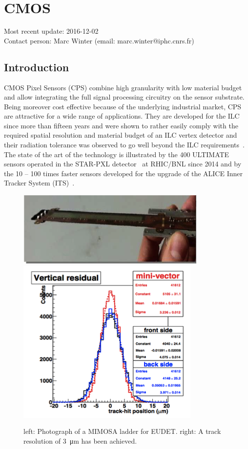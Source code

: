 \section{CMOS}
Most recent update: 2016-12-02 \\
Contact person: Marc Winter (email: marc.winter@iphc.cnrs.fr)

\subsection{Introduction}
CMOS Pixel Sensors (CPS) combine high granularity with low material
budget and allow integrating the full signal processing circuitry on
the sensor substrate. Being moreover cost effective because of the
underlying industrial market, CPS are attractive for a wide range of
applications. They are developed for the ILC since more than fifteen
years and were shown to rather easily comply with the required spatial
resolution and material budget of an ILC vertex detector and their
radiation tolerance was observed to go well beyond the ILC requirements~\cite{Behnke:2013lya}. The state of the art of the technology is illustrated
by the 400 ULTIMATE sensors operated in the STAR-PXL detector~\cite{Greiner201168}
at RHIC/BNL since 2014 and by the 10 -- 100 times faster
sensors developed for the upgrade of the ALICE Inner Tracker System
(ITS)~\cite{0954-3899-41-8-087002}.

\begin{figure}
	\centering
	\includegraphics[width=.5\linewidth]{VertexDetector/CMOS/Ladder}
	\includegraphics[width=.34\linewidth]{VertexDetector/CMOS/trackResolution.png}
	\caption{left: Photograph of a MIMOSA ladder for EUDET. right: A track resolution of \SI{3}{\micro\meter} has been achieved.}
	\label{fig:VertexDetector:CMOS}
\end{figure}


